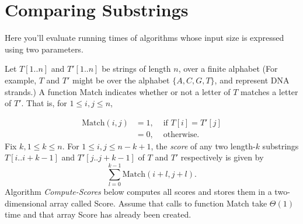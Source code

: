\documentclass[11pt]{article}
\newcommand{\Match}{\mbox{Match}}
\newcommand{\Score}{\mbox{Score}}
\begin{document}
\section{Comparing Substrings}
\label{sec-5}
Here you'll evaluate running times of algorithms whose
input size is expressed using two parameters.

Let $T[1..n]$ and $T'[1..n]$ be strings of length $n$, over a finite alphabet
(For example, $T$ and $T'$ might be over the alphabet $\{A,C,G,T\}$,
and represent DNA strands.)
A function Match indicates whether or not a letter of $T$ matches a
letter of $T'$.  That is, for $1 \le i,j \le n$, 

\[
\begin{array}{lll}
\Match(i,j) & = 1, & \mbox{ if } T[i] = T'[j] \\
         & = 0, & \mbox{ otherwise}.
\end{array}
\]
Fix $k, 1 \le k \le n$.
For $1 \le i,j \le n-k+1$, the \emph{score} of any two
length-$k$ substrings $T[i..i+k-1]$ and $T'[j..j+k-1]$ of $T$ and $T'$
respectively is given by
\[
\sum_{l = 0}^{k-1} \Match(i+l,j+l).
\]
Algorithm \emph{Compute-Scores} below computes all scores and stores them
in a two-dimensional array called Score.  Assume that calls to
function Match take $\Theta(1)$ time and that array Score has
already been created.

\end{document}
